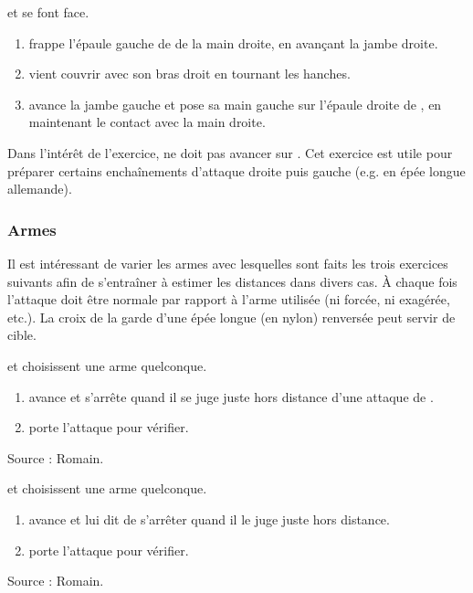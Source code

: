 \begin{exercice}
\label{struct:ex:frappe-gauche-droite}

\A et \D se font face.

\begin{enumerate}
	\item \A frappe l'épaule gauche de \D de la main droite, en avançant la jambe droite.
	\item \D vient couvrir avec son bras droit en tournant les hanches.
	\item \A avance la jambe gauche et pose sa main gauche sur l'épaule droite de \D, en maintenant le contact avec la main droite.
\end{enumerate}

Dans l'intérêt de l'exercice, \D ne doit pas avancer sur \A.
Cet exercice est utile pour préparer certains enchaînements d'attaque droite puis gauche (e.g.
en épée longue allemande).

\end{exercice}


\subsubsection{Armes}


Il est intéressant de varier les armes avec lesquelles sont faits les trois exercices suivants afin de s'entraîner à estimer les distances dans divers cas.
À chaque fois l'attaque doit être normale par rapport à l'arme utilisée (ni forcée, ni exagérée, etc.).
La croix de la garde d'une épée longue (en nylon) renversée peut servir de cible.


\begin{exercice}
\A et \D choisissent une arme quelconque.

\begin{enumerate}
	\item \A avance et s'arrête quand il se juge juste hors distance d'une attaque de \D.
	
	\item \D porte l'attaque pour vérifier.
\end{enumerate}

Source : Romain.

\end{exercice}


\begin{exercice}
\A et \D choisissent une arme quelconque.

\begin{enumerate}
	\item \A avance et \D lui dit de s'arrêter quand il le juge juste hors distance.
	
	\item \A porte l'attaque pour vérifier.
\end{enumerate}

Source : Romain.

\end{exercice}


